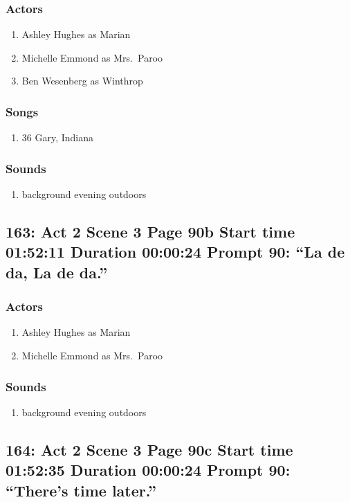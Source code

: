 \subsubsection{Actors}
\begin{enumerate}
\item Ashley Hughes as Marian
\item Michelle Emmond as Mrs.~Paroo
\item Ben Wesenberg as Winthrop
\end{enumerate}

\subsubsection{Songs}
\begin{enumerate}
\item 36 Gary, Indiana
\end{enumerate}\subsubsection{Sounds}
\begin{enumerate}
\item background evening outdoors
\end{enumerate}
\subsection{163: Act 2 Scene 3 Page 90b Start time 01:52:11 Duration 00:00:24 Prompt 90: ``La de da, La de da.''}

\subsubsection{Actors}
\begin{enumerate}
\item Ashley Hughes as Marian
\item Michelle Emmond as Mrs.~Paroo
\end{enumerate}

\subsubsection{Sounds}
\begin{enumerate}
\item background evening outdoors
\end{enumerate}
\subsection{164: Act 2 Scene 3 Page 90c Start time 01:52:35 Duration 00:00:24 Prompt 90: ``There's time later.''}

